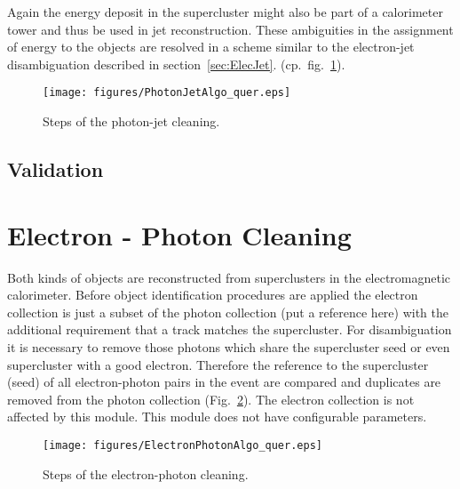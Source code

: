 \documentclass{cmspaper}
\begin{document}
Again the energy deposit in the supercluster might also be part of a
calorimeter tower and thus be used in jet reconstruction. These ambiguities in
the assignment of energy to the objects are resolved in a scheme similar to the
electron-jet disambiguation described in section~\ref{sec:ElecJet}. 
(cp.~fig.~\ref{fig:PJCleaning}).


\begin{figure}[hbt]
\begin{center}
\texttt{[image: figures/PhotonJetAlgo\_quer.eps]}
\caption{Steps of the photon-jet cleaning.}
\label{fig:PJCleaning}
\end{center}
\end{figure}

\subsection{Validation}


\clearpage
\section{Electron - Photon Cleaning}
Both kinds of objects are reconstructed from superclusters in the
electromagnetic calorimeter. Before object identification procedures are applied
the electron collection is just a subset of the photon collection (put a
reference here) with the additional requirement that a track matches the
supercluster. For disambiguation it is necessary to remove those photons which
share the supercluster seed or even supercluster with a good electron.
Therefore the reference to the supercluster (seed) of all electron-photon pairs
in the event are compared and duplicates are removed from the photon collection
(Fig.~\ref{fig:EPCleaning}). The electron collection is not affected by this
module. This module does not have configurable parameters.

\begin{figure}[hbt]
\begin{center}
\texttt{[image: figures/ElectronPhotonAlgo\_quer.eps]}
\caption{Steps of the electron-photon cleaning.}
\label{fig:EPCleaning}
\end{center}
\end{figure}
\end{document}
